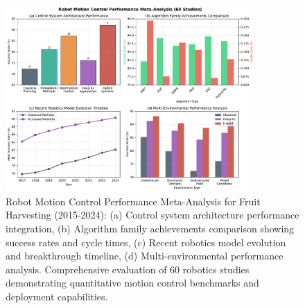 \documentclass{ieeeaccess}
\begin{document}
\begin{figure}[htbp]
\centering
\includegraphics[width=0.85\textwidth]{v5_motion_control_fig9.pdf}
\caption{Robot Motion Control Performance Meta-Analysis for Fruit Harvesting (2015-2024): (a) Control system architecture performance integration, (b) Algorithm family achievements comparison showing success rates and cycle times, (c) Recent robotics model evolution and breakthrough timeline, (d) Multi-environmental performance analysis. Comprehensive evaluation of 60 robotics studies demonstrating quantitative motion control benchmarks and deployment capabilities.}
\label{fig:motion_planning_analysis}
\end{figure}
\end{document}
